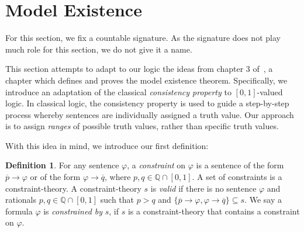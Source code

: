 \documentclass{amsart}
\theoremstyle{definition}
\newtheorem{definition}[theorem]{Definition}
\numberwithin{equation}{theorem}
\renewcommand{\phi}{\varphi}
\newcommand{\Q}{\mathbb{Q}}
\newcommand{\rat}[1]{{\overline{#1}}}
\newcommand{\narrow}[1]{\xrightarrow{#1}}
\renewcommand{\to}{\narrow{}}
\begin{document}
\section{Model Existence}
For this section, we fix a countable signature.
As the signature does not play much role for this section, we do not give it a name.

This section attempts to adapt to our logic the ideas from chapter 3 of~\cite{keisler1971model}, a chapter which defines and proves the model existence theorem.
Specifically, we introduce an adaptation of the classical \emph{consistency property} to $[0,1]$-valued logic.
In classical logic, the consistency property is used to guide a step-by-step process whereby sentences are individually assigned a truth value.
Our approach is to assign \emph{ranges} of possible truth values, rather than specific truth values.

With this idea in mind, we introduce our first definition:
\begin{definition}
  For any sentence $\phi$, a \emph{constraint} on $\phi$ is a sentence of the form $\rat p\to\phi$ or of the form $\phi\to\rat q$, where $p,q\in\Q\cap[0,1]$.
  A set of constraints is a constraint-theory.
  A constraint-theory $s$ is \emph{valid} if there is no sentence $\phi$ and rationals $p,q\in\Q\cap[0,1]$ such that $p>q$ and $\{\rat p\to\phi,\phi\to\rat q\}\subseteq s$.
  We say a formula $\phi$ is \emph{constrained by} $s$, if $s$ is a constraint-theory that contains a constraint on $\phi$.
\end{definition}
\end{document}
